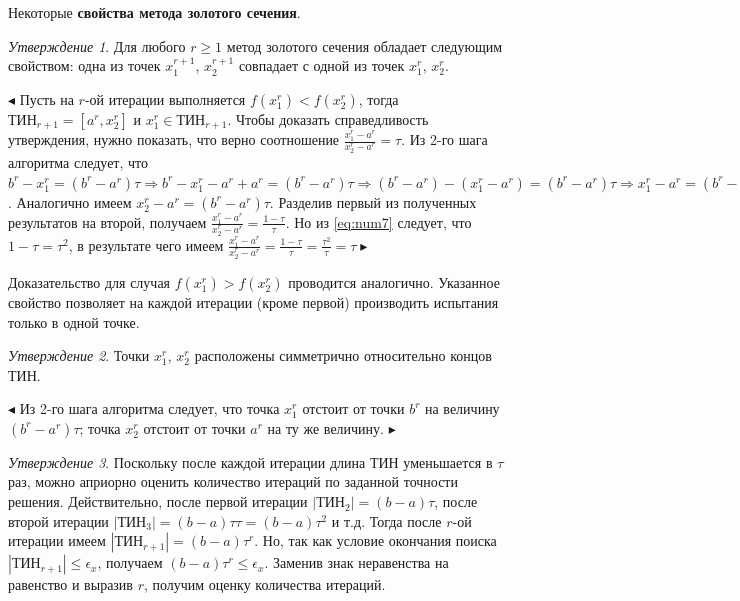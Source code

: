 \documentclass[a4paper,12pt]{report}
\begin{document}
Некоторые \textbf{свойства метода золотого сечения}.

\textit{Утверждение 1}. Для любого $r \geq 1$ метод золотого сечения обладает следующим свойством: одна из точек $x^{r+1}_{1}$, $x^{r+1}_{2}$ совпадает с одной из точек $x^{r}_{1}$, $x^{r}_{2}$.

$\blacktriangleleft$ Пусть на $r$-ой итерации выполняется $f(x^{r}_{1}) < f(x^{r}_{2})$, тогда $\text{ТИН}_{r+1} = \left[a^{r}, x^{r}_{2}\right]$ и $x^{r}_{1} \in \text{ТИН}_{r+1}$. Чтобы доказать справедливость утверждения, нужно показать, что верно соотношение $\frac{x^{r}_{1}-a^{r}}{x^{r}_{2}-a^{r}} = \tau$. Из 2-го шага алгоритма следует, что $b^{r}-x^{r}_{1} = \left(b^{r}-a^{r}\right)\tau \Rightarrow b^{r}-x^{r}_{1}-a^{r}+a^{r} = \left(b^{r}-a^{r}\right)\tau \Rightarrow \left(b^{r}-a^{r}\right)-\left(x^{r}_{1}-a^{r}\right) = \left(b^{r}-a^{r}\right)\tau \Rightarrow x^{r}_{1} - a^{r} = \left(b^{r}-a^{r}\right)\left(1-\tau\right)$. Аналогично имеем $x^{r}_{2}-a^{r} = \left(b^{r}-a^{r}\right)\tau$. Разделив первый из полученных результатов на второй, получаем $\frac{x^{r}_{1}-a^{r}}{x^{r}_{2}-a^{r}} = \frac{1-\tau}{\tau}$. Но из \eqref{eq:num7} следует, что $1-\tau = \tau^{2}$, в результате чего имеем $\frac{x^{r}_{1}-a^{r}}{x^{r}_{2}-a^{r}} = \frac{1-\tau}{\tau} = \frac{\tau^{2}}{\tau} = \tau \blacktriangleright$

Доказательство для случая $f(x^{r}_{1}) > f(x^{r}_{2})$ проводится аналогично. Указанное свойство позволяет на каждой итерации (кроме первой) производить испытания только в одной точке.

\textit{Утверждение 2}. Точки $x^{r}_{1}$, $x^{r}_{2}$ расположены симметрично относительно концов ТИН.

$\blacktriangleleft$ Из 2-го шага алгоритма следует, что точка $x^{r}_{1}$ отстоит от точки $b^{r}$ на величину $\left(b^{r}-a^{r}\right)\tau$; точка $x^{r}_{2}$ отстоит от точки $a^{r}$ на ту же величину. $\blacktriangleright$

\textit{Утверждение 3}. Поскольку после каждой итерации длина ТИН уменьшается в $\tau$ раз, можно априорно оценить количество итераций по заданной точности решения. Действительно, после первой итерации $\left|\text{ТИН}_{2}\right| = \left(b-a\right)\tau$, после второй итерации $\left|\text{ТИН}_{3}\right| = \left(b-a\right)\tau\tau = \left(b-a\right)\tau^{2}$ и т.д. Тогда после $r$-ой итерации имеем $\left|\text{ТИН}_{r+1}\right| = \left(b-a\right)\tau^{r}$. Но, так как условие окончания поиска $\left|\text{ТИН}_{r+1}\right| \leq \epsilon_{x}$, получаем $\left(b-a\right)\tau^{r} \leq \epsilon_{x}$. Заменив знак неравенства на равенство и выразив $r$, получим оценку количества итераций.
\end{document}
